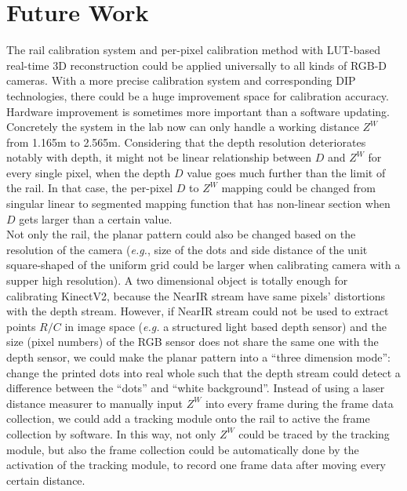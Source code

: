 \section{Future Work}
%
The rail calibration system and per-pixel calibration method with LUT-based real-time 3D reconstruction could be applied universally to all kinds of RGB-D cameras. With a more precise calibration system and corresponding DIP technologies, there could be a huge improvement space for calibration accuracy. Hardware improvement is sometimes more important than a software updating. Concretely the system in the lab now can only handle a working distance \(Z^W\) from 1.165m to 2.565m. Considering that the depth resolution deteriorates notably with depth, it might not be linear relationship between \(D\) and \(Z^W\) for every single pixel, when the depth \(D\) value goes much further than the limit of the rail. In that case, the per-pixel \(D\) to \(Z^W\) mapping could be changed from singular linear to segmented mapping function that has non-linear section when \(D\) gets larger than a certain value.
\\\indent
Not only the rail, the planar pattern could also be changed based on the resolution of the camera (\textit{e.g.}, size of the dots and side distance of the unit square-shaped of the uniform grid could be larger when calibrating camera with a supper high resolution). A two dimensional object is totally enough for calibrating KinectV2, because the NearIR stream have same pixels' distortions with the depth stream. However, if NearIR stream could not be used to extract points \(R/C\) in image space (\textit{e.g.} a structured light based depth sensor) and the size (pixel numbers) of the RGB sensor does not share the same one with the depth sensor, we could make the planar pattern into a \enquote{three dimension mode}: change the printed dots into real whole such that the depth stream could detect a difference between the \enquote{dots} and \enquote{white background}. Instead of using a laser distance measurer to manually input \(Z^W\) into every frame during the frame data collection, we could add a tracking module onto the rail to active the frame collection by software. In this way, not only \(Z^W\) could be traced by the tracking module, but also the frame collection could be automatically done by the activation of the tracking module, to record one frame data after moving every certain distance. 
